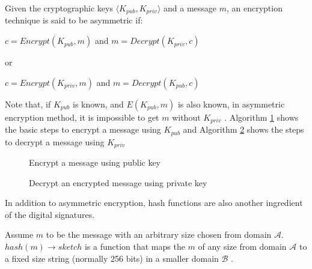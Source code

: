 		\begin{defn}
			 Given the cryptographic keys $\langle K_{pub}, K_{priv} \rangle$ and a message $m$, an encryption technique is said to be asymmetric if:
			\begin{center}
				$c = Encrypt(K_{pub},m)$ and  $m = Decrypt(K_{priv},c)$
			\end{center}
			or
			\begin{center}
				$c = Encrypt(K_{priv},m)$ and  $m = Decrypt(K_{pub},c)$
			\end{center}
		\label{dfn:asymmetric_encryption}
		\end{defn}

		Note that, if $K_{pub}$ is known, and $E(K_{pub},m)$ is also known, in asymmetric encryption method, it is impossible to get $m$ without $K_{priv}$ \cite{stallings2017cryptography}.
		Algorithm \ref{alg:encryption} shows the basic steps to encrypt a message using $K_{pub}$ and Algorithm \ref{alg:decryption} shows the steps to decrypt a message using $K_{priv}$
		\begin{figure}[h]
			\begin{algorithm}[H]
				\caption{Encrypt a message using public key}
				\SetAlCapNameFnt{\tiny}
				\label{alg:encryption}
				\DontPrintSemicolon
			\end{algorithm}
		\end{figure}


		\begin{figure}[h]
			\begin{algorithm}[H]
				\SetAlgoLined
				\caption{Decrypt an encrypted message using private key}
				\SetAlCapNameFnt{\tiny}
				\label{alg:decryption}
				\DontPrintSemicolon
			\end{algorithm}
		\end{figure}

		In addition to asymmetric encryption, hash functions are also another ingredient of the digital signatures.
		\begin{defn}
			Assume $m$ to be the message with an arbitrary size chosen from domain $\mathcal{A}$. $hash(m)\rightarrow sketch$ is a function that maps the $m$ of any size from domain $\mathcal{A}$ to a fixed size string (normally 256 bits) in a smaller domain $\mathcal{B}$ \cite{aumasson2014thehash}.
		\label{dfn:hash_function}
		\end{defn}

